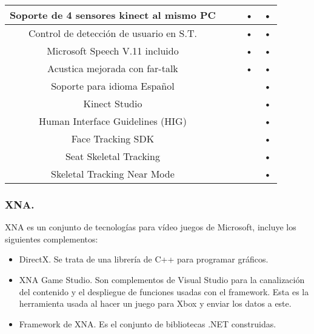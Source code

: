 \documentclass[11pt,a4paper]{article}
\begin{document}
\begin{tabular}{||c||c||c||c||c||}
\hline Soporte de 4 sensores kinect al mismo PC &        &        & •         & •           \\ 
\hline Control de detección de usuario en S.T.  &        &        & •         & •           \\ 
\hline Microsoft Speech V.11 incluido           &        &        & •         & •           \\  
\hline Acustica mejorada con far-talk           &        &        & •         & •           \\  
\hline Soporte para idioma Español              &        &        &           & •           \\ 
\hline Kinect Studio                            &        &        &           & •           \\ 
\hline Human Interface Guidelines (HIG)         &        &        &           & •           \\ 
\hline Face Tracking SDK                        &        &        &           & •           \\ 
\hline Seat Skeletal Tracking                   &        &        &           & •           \\ 
\hline Skeletal Tracking Near Mode              &        &        &           & •           \\ 
\hline 
\end{tabular} 

\subsubsection{XNA.}
XNA es un conjunto de tecnologías para vídeo juegos de Microsoft, incluye los siguientes complementos: 
\begin{itemize}
\item DirectX. Se trata de una librería de C++ para programar gráficos.
\item XNA Game Studio. Son complementos de Visual Studio para la canalización del contenido y el despliegue de funciones usadas con el framework. Esta es la herramienta usada al hacer un juego para Xbox y enviar los datos a este.
\item Framework de XNA. Es el conjunto de bibliotecas .NET construidas.
\end{itemize}
\end{document}
